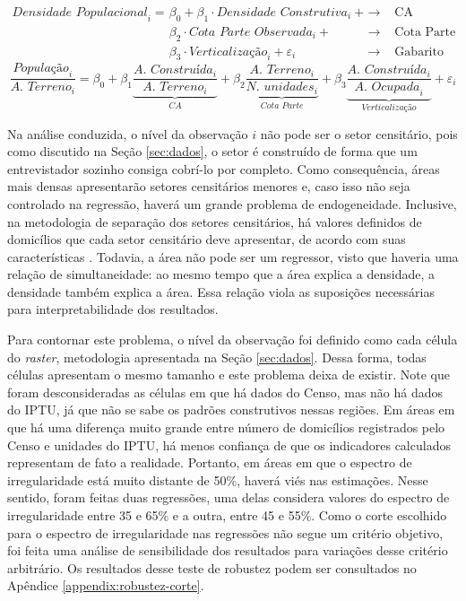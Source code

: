 \begin{align}
    \textit{Densidade Populacional}_i =
    &\beta_0 + \beta_1 \cdot \textit{Densidade Construtiva}_i + & \rightarrow & \text{ CA}\nonumber\\
    &\beta_2 \cdot\textit{Cota Parte Observada}_i + & \rightarrow & \text{ Cota Parte} \\
    &\beta_3\cdot\textit{Verticalização}_i + \varepsilon_i & \rightarrow & \text{ Gabarito}\nonumber
    \label{eq:reg}
\end{align}
\begin{equation}
    \frac{\textit{População}_i}{\textit{A. Terreno}_i}=
    \beta_0+
    \beta_1\underbrace{\frac{\textit{A. Construída}_i}{\textit{A. Terreno}_i}}_\textit{CA}+
    \beta_2\underbrace{\frac{\textit{A. Terreno}_i}{\textit{N. unidades}_i}}_\textit{Cota Parte}+
    \beta_3\underbrace{\frac{\textit{A. Construída}_i}{\textit{A. Ocupada}_i}}_\textit{Verticalização}+\varepsilon_i
    \label{eq:reg2}
\end{equation}

Na análise conduzida, o nível da observação $i$ não pode ser o setor censitário, pois como discutido na Seção \ref{sec:dados}, o setor é construído de forma que um entrevistador sozinho consiga cobrí-lo por completo. Como consequência, áreas mais densas apresentarão setores censitários menores e, caso isso não seja controlado na regressão, haverá um grande problema de endogeneidade. Inclusive, na metodologia de separação dos setores censitários, há valores definidos de domicílios que cada setor censitário deve apresentar, de acordo com suas características \cite{IBGE2024}. Todavia, a área não pode ser um regressor, visto que haveria uma relação de simultaneidade: ao mesmo tempo que a área explica a densidade, a densidade também explica a área. Essa relação viola as suposições necessárias para interpretabilidade dos resultados.

Para contornar este problema, o nível da observação foi definido como cada célula do \textit{raster}, metodologia apresentada na Seção \ref{sec:dados}. Dessa forma, todas células apresentam o mesmo tamanho e este problema deixa de existir. Note que foram desconsideradas as células em que há dados do Censo, mas não há dados do IPTU, já que não se sabe os padrões construtivos nessas regiões. Em áreas em que há uma diferença muito grande entre número de domicílios registrados pelo Censo e unidades do IPTU, há menos confiança de que os indicadores calculados representam de fato a realidade. Portanto, em áreas em que o espectro de irregularidade está muito distante de 50\%, haverá viés nas estimações. Nesse sentido, foram feitas duas regressões, uma delas considera valores do espectro de irregularidade entre 35 e 65\% e a outra, entre 45 e 55\%. Como o corte escolhido para o espectro de irregularidade nas regressões não segue um critério objetivo, foi feita uma análise de sensibilidade dos resultados para variações desse critério arbitrário. Os resultados desse teste de robustez podem ser consultados no Apêndice \ref{appendix:robustez-corte}.

